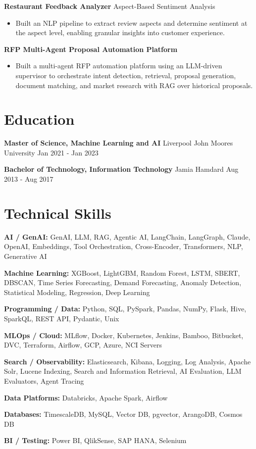 \documentclass[10pt,a4paper]{article}
\begin{document}
\textbf{Restaurant Feedback Analyzer} \textbar{} Aspect-Based Sentiment Analysis\par
\begin{itemize}
  \item Built an NLP pipeline to extract review aspects and determine sentiment at the aspect level, enabling granular insights into customer experience.
\end{itemize}
\textbf{RFP Multi-Agent Proposal Automation Platform}\par
\begin{itemize}
  \item Built a multi-agent RFP automation platform using an LLM-driven supervisor to orchestrate intent detection, retrieval, proposal generation, document matching, and market research with RAG over historical proposals.
\end{itemize}

\section{Education}
\textbf{Master of Science, Machine Learning and AI} \textbar{} Liverpool John Moores University \hfill Jan 2021 - Jan 2023\par
\textbf{Bachelor of Technology, Information Technology} \textbar{} Jamia Hamdard \hfill Aug 2013 - Aug 2017\par

\section{Technical Skills}
\textbf{AI / GenAI:} GenAI, LLM, RAG, Agentic AI, LangChain, LangGraph, Claude, OpenAI, Embeddings, Tool Orchestration, Cross-Encoder, Transformers, NLP, Generative AI\par
\textbf{Machine Learning:} XGBoost, LightGBM, Random Forest, LSTM, SBERT, DBSCAN, Time Series Forecasting, Demand Forecasting, Anomaly Detection, Statistical Modeling, Regression, Deep Learning\par
\textbf{Programming / Data:} Python, SQL, PySpark, Pandas, NumPy, Flask, Hive, SparkQL, REST API, Pydantic, Unix\par
\textbf{MLOps / Cloud:} MLflow, Docker, Kubernetes, Jenkins, Bamboo, Bitbucket, DVC, Terraform, Airflow, GCP, Azure, NCI Servers\par
\textbf{Search / Observability:} Elasticsearch, Kibana, Logging, Log Analysis, Apache Solr, Lucene Indexing, Search and Information Retrieval, AI Evaluation, LLM Evaluators, Agent Tracing\par
\textbf{Data Platforms:} Databricks, Apache Spark, Airflow\par
\textbf{Databases:} TimescaleDB, MySQL, Vector DB, pgvector, ArangoDB, Cosmos DB\par
\textbf{BI / Testing:} Power BI, QlikSense, SAP HANA, Selenium\par
\end{document}

